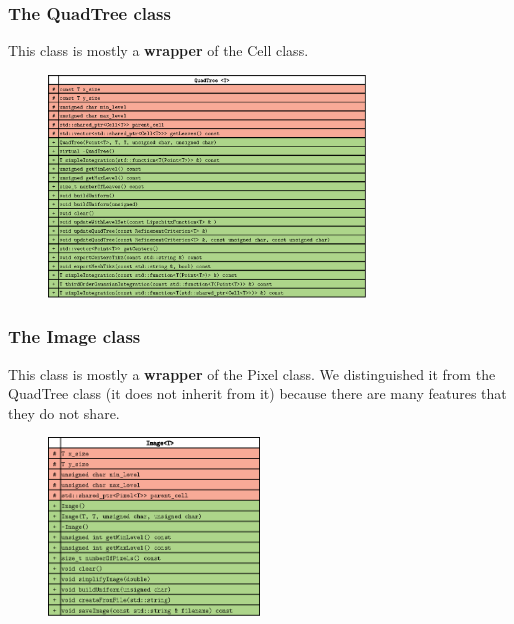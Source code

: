 \documentclass[8pt]{beamer}
\begin{document}
\begin{frame}
 \frametitle{The QuadTree class}
This class is mostly a \textbf{wrapper} of the Cell class.
\begin{figure}[!h]
\begin{center}
\includegraphics[width=0.75\textwidth]{./figures/quadtree_h.eps}
\end{center}
\end{figure}
\end{frame}

\begin{frame}
 \frametitle{The Image class}
This class is mostly a \textbf{wrapper} of the Pixel class.
We distinguished it from the QuadTree class (it does not inherit from it) because there are many features that they do not share.
\begin{figure}[!h]
\begin{center}
\includegraphics[width=0.5\textwidth]{./figures/image_h.eps}
\end{center}
\end{figure}
\end{frame}
\end{document}
